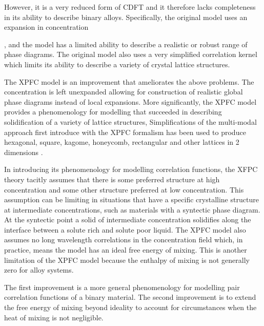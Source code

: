  However, it is a very reduced form of CDFT 
and it therefore lacks completeness in its ability to describe binary alloys. Specifically, the original 
model uses an expansion in concentration {, 
and the model has a limited ability to describe a realistic or robust range of 
phase diagrams. The original model also uses a very simplified correlation kernel which limits its 
ability to describe a variety of crystal lattice structures.

The XPFC model is an improvement that ameliorates the above problems. The
concentration is left unexpanded allowing for construction of realistic global
phase diagrams instead of local expansions. More significantly, the XPFC model provides a
phenomenology for modelling  that succeeded in describing
solidification of a variety of lattice structures,   Simplifications of the multi-modal approach first introduce with the XPFC formalism has been used to
produce hexagonal, square, kagome, honeycomb, rectangular and other lattices in
2 dimensions \cite{MKHONTA13}.


In introducing its phenomenology for modelling correlation functions, the  XFPC
theory tacitly assumes that there is some preferred structure at high
concentration and some other structure preferred at low concentration. This
assumption can be limiting in situations that have a specific crystalline
structure at intermediate concentrations, such as materials with a syntectic
phase diagram. At the syntectic point a solid of intermediate concentration
solidifies along the interface between a solute rich and solute poor liquid. The
XPFC model also assumes no long wavelength correlations in the concentration
field which, in practice, means the model has an ideal free energy of mixing.
This is another limitation of the XPFC model because the enthalpy of mixing is
not generally zero for alloy systems.


 The first 
improvement is a more general phenomenology for modelling pair correlation 
functions of a binary material. The second improvement is to extend the free energy 
of mixing beyond ideality to account for circumstances when the heat of mixing 
is not negligible.  

}
